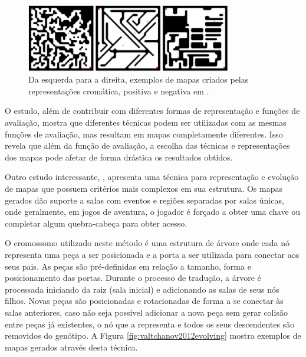 \begin{figure}[htb]
	\begin{center}
		\includegraphics[width=0.8\textwidth]{Imagens/ashlock2011search.jpg}
		\caption{Da esquerda para a direita, exemplos de mapas criados pelas representações cromática, positiva e negativa em \cite{ashlock2011search}.}
		\label{fig:ashlock2011search}
	\end{center}
\end{figure}

O estudo, além de contribuir com diferentes formas de representação e funções de avaliação, mostra que diferentes técnicas podem ser utilizadas com as mesmas funções de avaliação, mas resultam em mapas completamente diferentes. Isso revela que além da função de avaliação, a escolha das técnicas e representações dos mapas pode afetar de forma drástica os resultados obtidos.

Outro estudo interessante, \cite{valtchanov2012evolving}, apresenta uma técnica para representação e evolução de mapas que possuem critérios mais complexos em sua estrutura. Os mapas gerados dão suporte a salas com eventos e regiões separadas por salas únicas, onde geralmente, em jogos de aventura, o jogador é forçado a obter uma chave ou completar algum quebra-cabeça para obter acesso.

O cromossomo utilizado neste método é uma estrutura de árvore onde cada nó representa uma peça a ser posicionada e a porta a ser utilizada para conectar aos seus pais. As peças são pré-definidas em relação a tamanho, forma e posicionamento das portas. Durante o processo de tradução, a árvore é processada iniciando da raiz (sala inicial) e adicionando as salas de seus nós filhos. Novas peças são posicionadas e rotacionadas de forma a se conectar às salas anteriores, caso não seja possível adicionar a nova peça sem gerar colisão entre peças já existentes, o nó que a representa e todos os seus descendentes são removidos do genótipo. A Figura \ref{fig:valtchanov2012evolving} mostra exemplos de mapas gerados através desta técnica.

